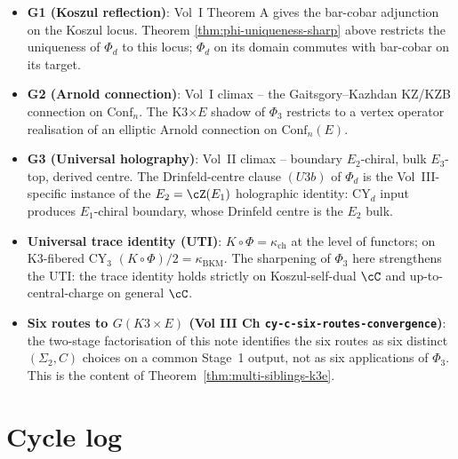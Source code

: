 \documentclass[11pt]{article}
\theoremstyle{definition}
\providecommand{\Eone}{E_1}
\providecommand{\kBKM}{\kappa_{\mathrm{BKM}}}
\begin{document}
\begin{itemize}[leftmargin=*]
\item \textbf{G1 (Koszul reflection)}: Vol~I Theorem A gives the
bar-cobar adjunction on the Koszul locus. Theorem
\ref{thm:phi-uniqueness-sharp} above restricts the uniqueness of
$\Phi_d$ to this locus; $\Phi_d$ on its domain commutes with
bar-cobar on its target.

\item \textbf{G2 (Arnold connection)}: Vol~I climax -- the Gaitsgory--Kazhdan
KZ/KZB connection on $\mathrm{Conf}_n$. The K3$\times E$ shadow of
$\Phi_3$ restricts to a vertex operator realisation of an elliptic
Arnold connection on $\mathrm{Conf}_n(E)$.

\item \textbf{G3 (Universal holography)}: Vol~II climax -- boundary
$E_2$-chiral, bulk $E_3$-top, derived centre. The Drinfeld-centre clause
$(U3b)$ of $\Phi_d$ is the Vol~III-specific instance of the
$E_2 = \cZ(E_1)$ holographic identity: CY$_d$ input produces
$\Eone$-chiral boundary, whose Drinfeld centre is the $E_2$ bulk.

\item \textbf{Universal trace identity (UTI)}: $K \circ \Phi = \kappa_{\mathrm{ch}}$
at the level of functors; on K3-fibered CY$_3$ $(K \circ \Phi)/2 = \kBKM$.
The sharpening of $\Phi_3$ here strengthens the UTI: the trace
identity holds strictly on Koszul-self-dual $\cC$ and
up-to-central-charge on general $\cC$.

\item \textbf{Six routes to $G(K3 \times E)$ (Vol III Ch
\texttt{cy-c-six-routes-convergence})}: the two-stage factorisation of
this note identifies the six routes as six distinct $(\Sigma_2, C)$
choices on a common Stage~1 output, not as six applications of
$\Phi_3$. This is the content of
Theorem~\ref{thm:multi-siblings-k3e}.
\end{itemize}

\section*{Cycle log}
\end{document}

